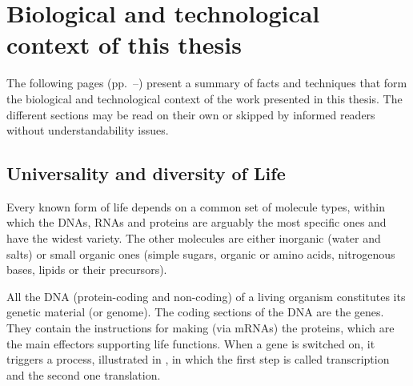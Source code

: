 \chapter{Biological and technological context of this thesis}%
\label{ch:background}

\setlength{\epigraphwidth}{0.9\textwidth}
\setlength{\epigraphrule}{0pt}

The following pages (pp.~\pageref{sec:bio}--\pageref{sec:bgConcl})
present a summary of facts and techniques
that form the biological and technological context
of the work presented in this thesis.
The different sections may be read on their own
or skipped by informed readers without understandability issues.

\vspace{-1mm}
\section{Universality and diversity of Life}\label{sec:bio}
\vspace{-1mm}

Every known form of life depends on a common set of molecule types,
within which the \glspl{DNA}, \glspl{RNA} and proteins
are arguably the most specific ones and have the widest variety.
The other molecules are either inorganic (water and salts)
or small organic ones (simple sugars, organic or amino acids,
nitrogenous bases, lipids or their precursors).~

All the \gls{DNA} (protein-coding and non-coding) of a living organism
constitutes its genetic material (or genome).
The coding sections of the \gls{DNA} are the genes.
They contain the instructions for making (via \glspl{mRNA}) the proteins,
which are the main effectors supporting life functions.
When a gene is switched on,
it triggers a process,
illustrated in ,
in which the first step is called transcription
and the second one translation.~

